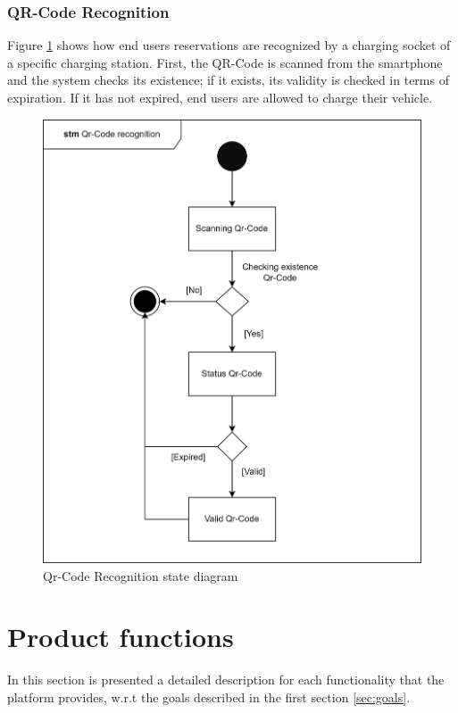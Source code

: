 \subsubsection{QR-Code Recognition}
Figure \ref{fig:qr-code} shows how end users reservations are recognized by a charging socket of a specific charging station. First, the QR-Code is scanned from the smartphone and the system checks its existence; if it exists, its validity is checked in terms of expiration. If it has not expired, end users are allowed to charge their vehicle.
\begin{figure}[H]
\begin{center}
\includegraphics[width=1.0\textwidth]{images/qrcode.png}
\caption{Qr-Code Recognition state diagram}
\label{fig:qr-code}
\end{center}
\end{figure}

\section{Product functions}
In this section is presented a detailed description for each functionality that the platform provides, w.r.t the goals described in the first section \ref{sec:goals}.
